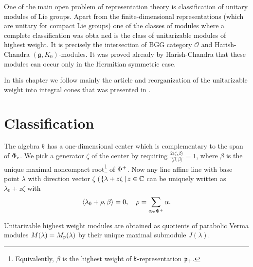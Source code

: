 \documentclass[12pt,a4paper,final]{report}
\begin{document}
One of the main open problem of representation theory is classification of unitary modules of Lie groups. Apart from the finite-dimensional representations (which are unitary for compact Lie groups) one of the classes of modules where a complete classification was obta
ned is the class of unitarizable modules of highest weight. It is precisely the intersection of BGG category $\mathcal{O}$ and Harish-Chandra $(\mathfrak{g}, K_0)$-modules. It was proved already by Harish-Chandra that these modules can occur only in the Hermitian symmetric case.

In this chapter we follow mainly the article \cite{enright_classification_1983} and reorganization of the unitarizable weight into integral cones that was presented in \cite{davidson_differential_1991}. 

\section{Classification}

The algebra $\mathfrak{k}$ has a one-dimensional center which is complementary to the span of $\Phi_c$. We pick a generator $\zeta$ of the center by requiring $\frac{2 \langle \zeta,\beta \rangle}{\langle \beta, \beta \rangle} = 1$, where $\beta$ is the unique maximal noncompact root\footnote{Equivalently, $\beta$ is the highest weight of $\mathfrak{k}$-representation $\mathfrak{p}_+$.} of $\Phi^+$. Now any line affine line with base point $\lambda$ with direction vector $\zeta$ ($\{\lambda+z\zeta \,|\, z\in\mathbb{C}$ can be uniquely written as $\lambda_0 + z\zeta$ with
\[
 \langle \lambda_0 + \rho,\beta \rangle = 0, \quad \rho =\sum_{\alpha\in\Phi^+} \alpha.
\]

Unitarizable highest weight modules are obtained as quotients of parabolic Verma modules $M(\lambda) = M_{\mathfrak{p}}(\lambda)$ by their unique maximal submodule $J(\lambda)$.
\end{document}

